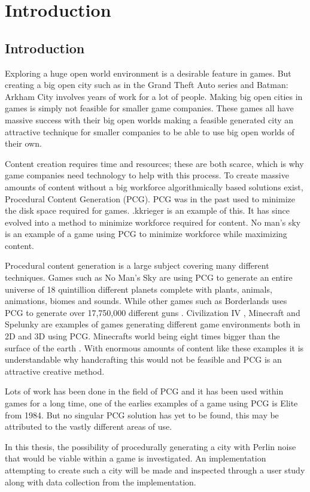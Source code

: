\section{Introduction}
	\subsection{Introduction}
	Exploring a huge open world environment is a desirable feature in games. But creating a big open city such as in the Grand Theft Auto series and Batman: Arkham City involves years of work for a lot of people. Making big open cities in games is simply not feasible for smaller game companies. These games all have massive success with their big open worlds making a feasible generated city an attractive technique for smaller companies to be able to use big open worlds of their own.
	\par
	Content creation requires time and resources; these are both scarce, which is why game companies need technology to help with this process.
	To create massive amounts of content without a big workforce algorithmically based solutions exist, Procedural Content Generation (PCG). PCG was in the past used to minimize the disk space required for games. .kkrieger is an  example of this. It has since evolved into a method to minimize workforce required for content. No man’s sky is an example of a game using PCG to minimize workforce while maximizing content.
	\par
	Procedural content generation is a large subject covering many different techniques. Games such as No Man's Sky \cite{NoMansSky} are using PCG to generate an entire universe of 18 quintillion \cite{NoMansSkyplanets} different planets complete with plants, animals, animations, biomes and sounds. While other games such as Borderlands \cite{Borderlands} uses PCG to generate over 17,750,000 different guns \cite{BorderlandsWeapons}. Civilization IV \cite{CivilizationCompany}, Minecraft \cite{Minecraft} and Spelunky \cite{Spelunky} are examples of games generating different game environments both in 2D and 3D using PCG. Minecrafts world being eight times bigger than the surface of the earth \cite{MinecraftSize}. With enormous amounts of content like these examples it is understandable why handcrafting this would not be feasible and PCG is an attractive creative method.
	\par
	Lots of work has been done in the field of PCG and it has been used within games for a long time, one of the earlies examples of a game using PCG is Elite \cite{Elite} from 1984. But no singular PCG solution has yet to be found, this may be attributed to the vastly different areas of use.
	\par
	In this thesis, the possibility of procedurally generating a city with Perlin noise that would be viable within a game is investigated. An implementation attempting to create such a city will be made and inspected through a user study along with data collection from the implementation.
	
